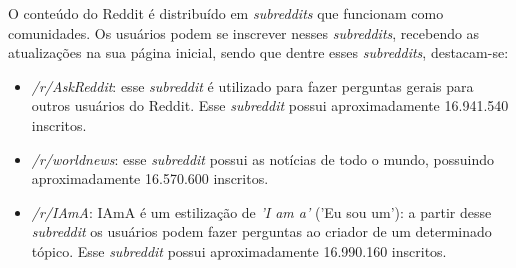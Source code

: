 O conteúdo do Reddit é distribuído em \textit{subreddits} que funcionam como
comunidades. Os usuários podem se inscrever nesses
\textit{subreddits}, recebendo as atualizações na sua página inicial, sendo
que dentre esses \textit{subreddits}, destacam-se:


\begin{itemize}
  \item \textit{/r/AskReddit}: esse \textit{subreddit} é utilizado para fazer
  perguntas gerais para outros usuários do Reddit. Esse \textit{subreddit}
  possui aproximadamente 16.941.540 inscritos.
  \item \textit{/r/worldnews}: esse \textit{subreddit} possui as notícias de
  todo o mundo, possuindo aproximadamente 16.570.600 inscritos.
  \item \textit{/r/IAmA}: IAmA é um estilização de \textit{'I am a'} ('Eu sou
  um'):
  a partir desse \textit{subreddit} os usuários podem fazer perguntas ao criador
  de um determinado tópico. Esse \textit{subreddit} possui aproximadamente
  16.990.160 inscritos.
\end{itemize}

% 


